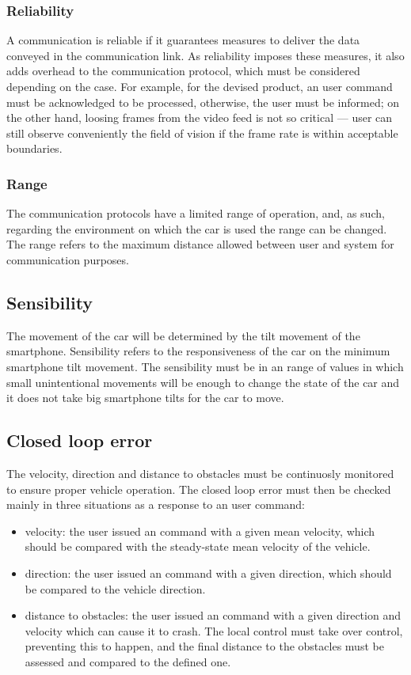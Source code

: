 \subsubsection{Reliability}
\label{sec:orgdcb920d}
A communication is reliable if it guarantees measures to deliver the data conveyed in the communication link. As reliability imposes these measures, it also adds overhead to the communication protocol, which must be considered depending on the case. For example, for the devised product, an user command must be acknowledged to be processed, otherwise, the user must be informed; on the other hand, loosing frames from the video feed is not so critical — user can still observe conveniently the ﬁeld of vision if the frame rate is within acceptable boundaries.
\subsubsection{Range}
\label{sec:org447a205}
The communication protocols have a limited range of operation, and, as such, regarding the environment on which the car is used the range can be changed.
The range refers to the maximum distance allowed between user and system for communication purposes.
\subsection{Sensibility}
\label{sec:org622e63a}
The movement of the car will be determined by the tilt movement of the smartphone. Sensibility refers to the responsiveness of the car on the minimum smartphone tilt movement. The sensibility must be in an range of values in which small unintentional movements will be enough to change the state of the car and it does not take big smartphone tilts for the car to move.
\subsection{Closed loop error}
\label{sec:org436f732}
The velocity, direction and distance to obstacles must be continuosly monitored to ensure proper vehicle operation. The closed loop error must then be checked mainly in three situations as a response to an user command:
\begin{itemize}
\item velocity: the user issued an command with a given mean velocity, which should be compared with the steady-state mean velocity of the vehicle.
\item direction: the user issued an command with a given direction, which should be compared to the vehicle direction.
\item distance to obstacles: the user issued an command with a given direction and velocity which can cause it to crash. The local control must take over control, preventing this to happen, and the final distance to the obstacles must be assessed and compared to the defined one.
\end{itemize}
